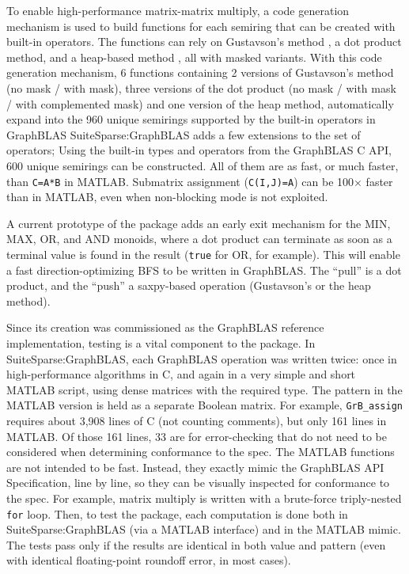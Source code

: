 To enable high-performance matrix-matrix multiply, a code generation mechanism
is used to build functions for each semiring that can be created with built-in
operators.  The functions can rely on Gustavson's method \cite{Gustavson78}, a
dot product method, and a heap-based method \cite{sisc3dspgemm}, all with
masked variants.  With this code generation mechanism, 6 functions
containing 2 versions of Gustavson's method (no mask / with mask),
three versions of the dot product (no mask / with mask / with complemented
mask) and one version of the heap method, automatically expand into the 960
unique semirings supported by the built-in operators in GraphBLAS
SuiteSparse:GraphBLAS adds a few extensions to the set of operators;
Using the  built-in types and operators from the GraphBLAS C API,
600 unique semirings can be constructed.  All of them are as fast, or much
faster, than \verb'C=A*B' in MATLAB.  Submatrix assignment (\verb'C(I,J)=A')
can be 100$\times$ faster than in MATLAB, even when non-blocking mode is not exploited.

A current prototype of the package adds an early exit
mechanism for the MIN, MAX, OR, and AND monoids, where a dot product can
terminate as soon as a terminal value is found in the result (\verb'true' for
OR, for example).  This will enable a fast direction-optimizing BFS
\cite{Beamer:2012:DOB} to be written in GraphBLAS.  The ``pull'' is a dot
product, and the ``push'' a saxpy-based operation (Gustavson's or the heap
method).

Since its creation was commissioned as the GraphBLAS reference implementation,
testing is a vital component to the package.  In SuiteSparse:GraphBLAS, each
GraphBLAS operation was written twice: once in high-performance algorithms in
C, and again in a very simple and short MATLAB script, using dense matrices
with the required type.  The pattern in the MATLAB version is held as a
separate Boolean matrix.  For example, \verb'GrB_assign' requires about 3,908
lines of C (not counting comments), but only 161 lines in MATLAB. Of those 161
lines, 33 are for error-checking that do not need to be considered when
determining conformance to the spec.  The MATLAB functions are not intended to
be fast.  Instead, they exactly mimic the GraphBLAS API Specification, line by
line, so they can be visually inspected for conformance to the spec.  For
example, matrix multiply is written with a brute-force triply-nested \verb'for'
loop.  Then, to test the package, each computation is done both in
SuiteSparse:GraphBLAS (via a MATLAB interface) and in the MATLAB mimic.  The
tests pass only if the results are identical in both value and pattern (even
with identical floating-point roundoff error, in most cases).

